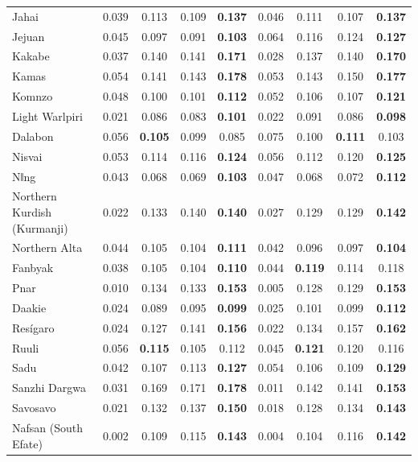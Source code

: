 \begin{longtable}{lcccccccc}
Jahai & 0.039 & 0.113 & 0.109 & \textbf{0.137} & 0.046 & 0.111 & 0.107 & \textbf{0.137} \\
Jejuan & 0.045 & 0.097 & 0.091 & \textbf{0.103} & 0.064 & 0.116 & 0.124 & \textbf{0.127} \\
Kakabe & 0.037 & 0.140 & 0.141 & \textbf{0.171} & 0.028 & 0.137 & 0.140 & \textbf{0.170} \\
Kamas & 0.054 & 0.141 & 0.143 & \textbf{0.178} & 0.053 & 0.143 & 0.150 & \textbf{0.177} \\
Komnzo & 0.048 & 0.100 & 0.101 & \textbf{0.112} & 0.052 & 0.106 & 0.107 & \textbf{0.121} \\
Light Warlpiri & 0.021 & 0.086 & 0.083 & \textbf{0.101} & 0.022 & 0.091 & 0.086 & \textbf{0.098} \\
Dalabon & 0.056 & \textbf{0.105} & 0.099 & 0.085 & 0.075 & 0.100 & \textbf{0.111} & 0.103 \\
Nisvai & 0.053 & 0.114 & 0.116 & \textbf{0.124} & 0.056 & 0.112 & 0.120 & \textbf{0.125} \\
Nǁng & 0.043 & 0.068 & 0.069 & \textbf{0.103} & 0.047 & 0.068 & 0.072 & \textbf{0.112} \\
Northern Kurdish (Kurmanji) & 0.022 & 0.133 & 0.140 & \textbf{0.140} & 0.027 & 0.129 & 0.129 & \textbf{0.142} \\
Northern Alta & 0.044 & 0.105 & 0.104 & \textbf{0.111} & 0.042 & 0.096 & 0.097 & \textbf{0.104} \\
Fanbyak & 0.038 & 0.105 & 0.104 & \textbf{0.110} & 0.044 & \textbf{0.119} & 0.114 & 0.118 \\
Pnar & 0.010 & 0.134 & 0.133 & \textbf{0.153} & 0.005 & 0.128 & 0.129 & \textbf{0.153} \\
Daakie & 0.024 & 0.089 & 0.095 & \textbf{0.099} & 0.025 & 0.101 & 0.099 & \textbf{0.112} \\
Resígaro & 0.024 & 0.127 & 0.141 & \textbf{0.156} & 0.022 & 0.134 & 0.157 & \textbf{0.162} \\
Ruuli & 0.056 & \textbf{0.115} & 0.105 & 0.112 & 0.045 & \textbf{0.121} & 0.120 & 0.116 \\
Sadu & 0.042 & 0.107 & 0.113 & \textbf{0.127} & 0.054 & 0.106 & 0.109 & \textbf{0.129} \\
Sanzhi Dargwa & 0.031 & 0.169 & 0.171 & \textbf{0.178} & 0.011 & 0.142 & 0.141 & \textbf{0.153} \\
Savosavo & 0.021 & 0.132 & 0.137 & \textbf{0.150} & 0.018 & 0.128 & 0.134 & \textbf{0.143} \\
Nafsan (South Efate) & 0.002 & 0.109 & 0.115 & \textbf{0.143} & 0.004 & 0.104 & 0.116 & \textbf{0.142} \\

\end{longtable}
